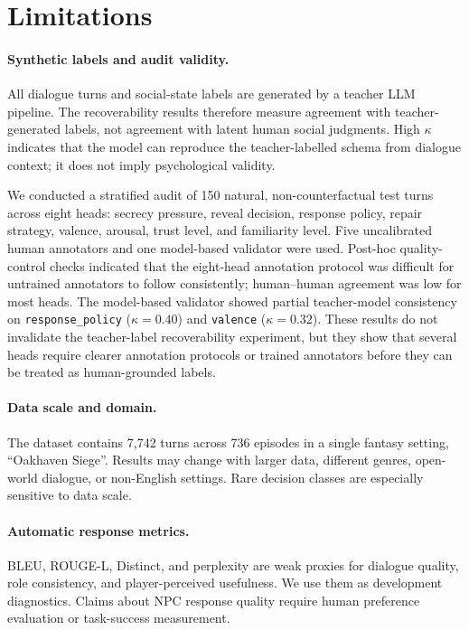\documentclass[11pt]{article}
\begin{document}
\section*{Limitations}
\label{sec:limitations}

\paragraph{Synthetic labels and audit validity.}
All dialogue turns and social-state labels are generated by a teacher LLM pipeline.
The recoverability results therefore measure agreement with teacher-generated labels, not agreement with latent human social judgments.
High $\kappa$ indicates that the model can reproduce the teacher-labelled schema from dialogue context; it does not imply psychological validity.

We conducted a stratified audit of 150 natural, non-counterfactual test turns across eight heads: secrecy pressure, reveal decision, response policy, repair strategy, valence, arousal, trust level, and familiarity level.
Five uncalibrated human annotators and one model-based validator were used.
Post-hoc quality-control checks indicated that the eight-head annotation protocol was difficult for untrained annotators to follow consistently; human--human agreement was low for most heads.
The model-based validator showed partial teacher-model consistency on \texttt{response\_policy} ($\kappa{=}0.40$) and \texttt{valence} ($\kappa{=}0.32$).
These results do not invalidate the teacher-label recoverability experiment, but they show that several heads require clearer annotation protocols or trained annotators before they can be treated as human-grounded labels.

\paragraph{Data scale and domain.}
The dataset contains 7,742 turns across 736 episodes in a single fantasy setting, ``Oakhaven Siege''.
Results may change with larger data, different genres, open-world dialogue, or non-English settings.
Rare decision classes are especially sensitive to data scale.

\paragraph{Automatic response metrics.}
BLEU, ROUGE-L, Distinct, and perplexity are weak proxies for dialogue quality, role consistency, and player-perceived usefulness.
We use them as development diagnostics.
Claims about NPC response quality require human preference evaluation or task-success measurement.
\end{document}
